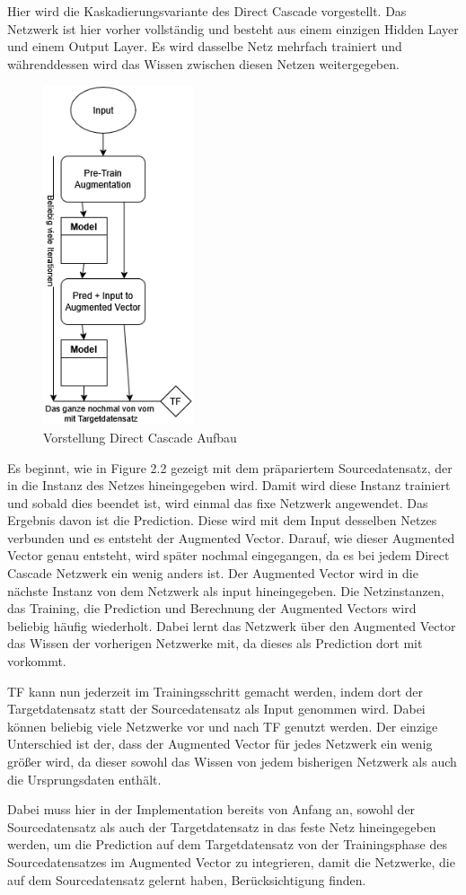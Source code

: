 Hier wird die Kaskadierungsvariante des Direct Cascade vorgestellt. 
Das Netzwerk ist hier vorher vollständig und besteht aus einem einzigen Hidden Layer und einem Output Layer. 
Es wird dasselbe Netz mehrfach trainiert und währenddessen wird das Wissen zwischen diesen Netzen weitergegeben. 

\begin{figure}[htpb]
    \includegraphics[height=10cm]{../../Graphiken/direct_cascade.png}
    \caption{\label{fig:directcascade} Vorstellung Direct Cascade Aufbau}
\end{figure}

Es beginnt, wie in Figure 2.2 gezeigt mit dem präpariertem Sourcedatensatz, der in die Instanz des Netzes hineingegeben wird. 
Damit wird diese Instanz trainiert und sobald dies beendet ist, wird einmal das fixe Netzwerk angewendet. Das Ergebnis davon ist 
die Prediction. Diese wird mit dem Input desselben Netzes verbunden und es entsteht der Augmented Vector. Darauf, wie dieser Augmented 
Vector genau entsteht, wird später nochmal eingegangen, da es bei jedem Direct Cascade Netzwerk ein wenig anders ist. Der Augmented 
Vector wird in die nächste Instanz von dem Netzwerk als input hineingegeben. Die Netzinstanzen, das Training, die Prediction und 
Berechnung der Augmented Vectors wird beliebig häufig wiederholt. Dabei lernt das Netzwerk über den Augmented Vector das Wissen 
der vorherigen Netzwerke mit, da dieses als Prediction dort mit vorkommt. 

TF kann nun jederzeit im Trainingsschritt gemacht werden, indem dort der Targetdatensatz statt der Sourcedatensatz als Input genommen 
wird. Dabei können beliebig viele Netzwerke vor und nach TF genutzt werden. Der einzige Unterschied ist der, dass der Augmented Vector 
für jedes Netzwerk ein wenig größer wird, da dieser sowohl das Wissen von jedem bisherigen Netzwerk als auch die Ursprungsdaten enthält. 

Dabei muss hier in der Implementation bereits von Anfang an, sowohl der Sourcedatensatz als auch der Targetdatensatz in das feste Netz 
hineingegeben werden, um die Prediction auf dem Targetdatensatz von der Trainingsphase des Sourcedatensatzes im Augmented Vector zu 
integrieren, damit die Netzwerke, die auf dem Sourcedatensatz gelernt haben, Berücksichtigung finden. 
